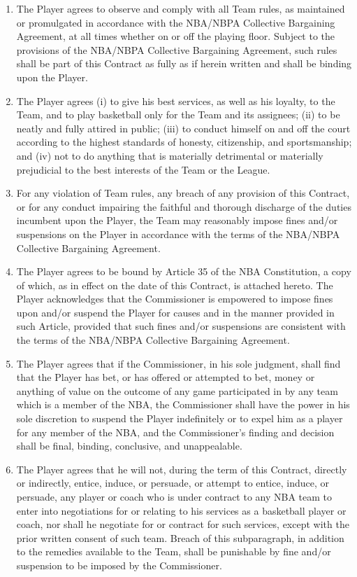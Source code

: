\documentclass[
]{book}
\providecommand{\tightlist}{%
  \setlength{\itemsep}{0pt}\setlength{\parskip}{0pt}}
\begin{document}
\begin{enumerate}
\def\labelenumi{(\alph{enumi})}
\tightlist
\item
  The Player agrees to observe and comply with all Team rules, as maintained or promulgated in accordance with the NBA/NBPA Collective Bargaining Agreement, at all times whether on or off the playing floor. Subject to the provisions of the NBA/NBPA Collective Bargaining Agreement, such rules shall be part of this Contract as fully as if herein written and shall be binding upon the Player.
\item
  The Player agrees (i) to give his best services, as well as his loyalty, to the Team, and to play basketball only for the Team and its assignees; (ii) to be neatly and fully attired in public; (iii) to conduct himself on and off the court according to the highest standards of honesty, citizenship, and sportsmanship; and (iv) not to do anything that is materially detrimental or materially prejudicial to the best interests of the Team or the League.
\item
  For any violation of Team rules, any breach of any provision of this Contract, or for any conduct impairing the faithful and thorough discharge of the duties incumbent upon the Player, the Team may reasonably impose fines and/or suspensions on the Player in accordance with the terms of the NBA/NBPA Collective Bargaining Agreement.
\item
  The Player agrees to be bound by Article 35 of the NBA Constitution, a copy of which, as in effect on the date of this Contract, is attached hereto. The Player acknowledges that the Commissioner is empowered to impose fines upon and/or suspend the Player for causes and in the manner provided in such Article, provided that such fines and/or suspensions are consistent with the terms of the NBA/NBPA Collective Bargaining Agreement.
\item
  The Player agrees that if the Commissioner, in his sole judgment, shall find that the Player has bet, or has offered or attempted to bet, money or anything of value on the outcome of any game participated in by any team which is a member of the NBA, the Commissioner shall have the power in his sole discretion to suspend the Player indefinitely or to expel him as a player for any member of the NBA, and the Commissioner's finding and decision shall be final, binding, conclusive, and unappealable.
\item
  The Player agrees that he will not, during the term of this Contract, directly or indirectly, entice, induce, or persuade, or attempt to entice, induce, or persuade, any player or coach who is under contract to any NBA team to enter into negotiations for or relating to his services as a basketball player or coach, nor shall he negotiate for or contract for such services, except with the prior written consent of such team. Breach of this subparagraph, in addition to the remedies available to the Team, shall be punishable by fine and/or suspension to be imposed by the Commissioner.

\end{enumerate}
\end{document}
